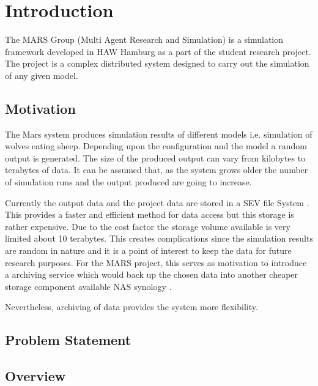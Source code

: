 \newpage
\chapter{Introduction}

The MARS Group (Multi Agent Research and Simulation) is a simulation framework developed 
in HAW Hamburg as a  part of the student research project. The project is a complex 
distributed system designed to carry  out the simulation of any given model. 
\cite{HAWHamburgMARS}
    \section{Motivation}
    The Mars system produces simulation results of different models i.e. simulation
    of wolves eating sheep. Depending upon the configuration and the model a random
    output is generated. The size of the produced output can vary from kilobytes to 
    terabytes of data. It can be assumed that, as the system grows older the number of 
    simulation runs and the output produced are going to increase.
    
    \par

    Currently the output data and the project data are stored in a
    SEV file System \cite{SEV}. This provides a faster and efficient method for data
    access but this storage is rather expensive. Due to the cost factor the storage 
    volume available is very limited about 10 terabytes. This creates complications
    since the simulation results are random in nature and it is a point of interest to
    keep the data for future research purposes. For the MARS project, this serves as 
    motivation to introduce a archiving service which would back up the chosen data
    into another cheaper storage component available NAS synology \cite{}. 

    \par

    Nevertheless, archiving of data provides the system more flexibility.
        
    \section{Problem Statement}
        

    \section{Overview}


